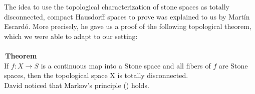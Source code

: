 The idea to use the topological characterization of stone spaces as totally disconnected, compact Hausdorff spaces to prove  was explained to us by Martín Escardó. More precisely, he gave us a proof of the following topological theorem, which we were able to adapt to our setting:\\
~\\
\,\textbf{Theorem}\\
  If $f : X \to S$ is a continuous map into a Stone space and all fibers of $f$ are Stone spaces, then the topological space X is totally disconnected. \\

David noticed that Markov's principle () holds. 
